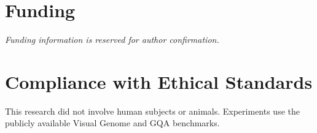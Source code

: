 \section*{Funding}
\textit{Funding information is reserved for author confirmation.}

\section*{Compliance with Ethical Standards}
This research did not involve human subjects or animals. Experiments use the
publicly available Visual Genome and GQA benchmarks.
